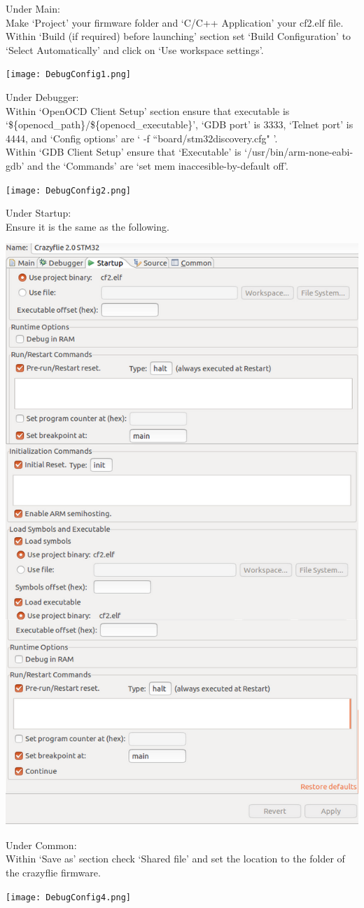 \documentclass[]{article}
\begin{document}
Under Main: \\
Make `Project' your firmware folder and `C/C++ Application' your cf2.elf file. Within `Build (if required) before launching' section set `Build Configuration' to `Select Automatically' and click on `Use workspace settings'.

\texttt{[image: DebugConfig1.png]}

Under Debugger: \\
Within `OpenOCD Client Setup' section ensure that executable is `\$\{openocd\_path\}/\$\{openocd\_executable\}', `GDB port' is 3333, `Telnet port' is 4444, and `Config options' are ` -f ``board/stm32discovery.cfg" '. \\
Within `GDB Client Setup' ensure that `Executable' is `/usr/bin/arm-none-eabi-gdb' and the `Commands' are `set mem inaccesible-by-default off'.

\texttt{[image: DebugConfig2.png]}

Under Startup: \\
Ensure it is the same as the following.

\includegraphics[width=0.55\linewidth]{DebugConfig3.png}

\newpage

Under Common: \\
Within `Save as' section check `Shared file' and set the location to the folder of the crazyflie firmware.

\texttt{[image: DebugConfig4.png]}
\end{document}
